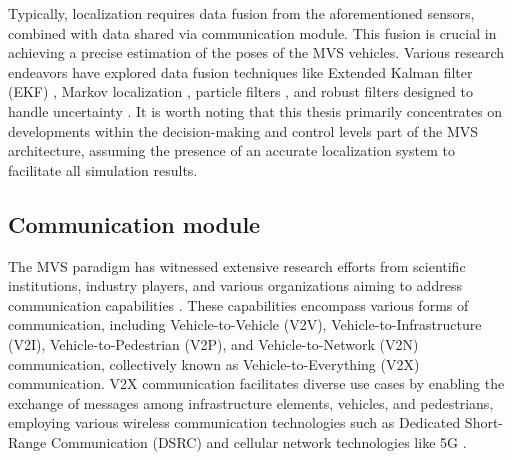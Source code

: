 

   Typically, localization requires data fusion from the aforementioned sensors, combined with data shared via communication module. This fusion is crucial in achieving a precise estimation of the poses of the MVS vehicles. Various research endeavors have explored data fusion techniques like Extended Kalman filter (EKF) \cite{huang2017new}, Markov localization \cite{bahr2009consistent}, particle filters \cite{rekleitis2003probabilistic}, and robust filters designed to handle uncertainty \cite{dong2015distributed}. It is worth noting that this thesis primarily concentrates on developments within the decision-making and control levels part of the MVS architecture, assuming the presence of an accurate localization system to facilitate all simulation results. 




       \subsection{Communication module} \label{sec: communication} 
       The MVS paradigm has witnessed extensive research efforts from scientific institutions, industry players, and various organizations aiming to address communication capabilities \cite{9217500}. These capabilities encompass various forms of communication, including Vehicle-to-Vehicle (V2V), Vehicle-to-Infrastructure (V2I), Vehicle-to-Pedestrian (V2P), and Vehicle-to-Network (V2N) communication, collectively known as Vehicle-to-Everything (V2X) communication. V2X communication facilitates diverse use cases by enabling the exchange of messages among infrastructure elements, vehicles, and pedestrians, employing various wireless communication technologies such as Dedicated Short-Range Communication (DSRC) \cite{kenney2011dedicated} \cite{vershinin2020vehicle} and cellular network technologies like 5G \cite{muhammad20215g}.


